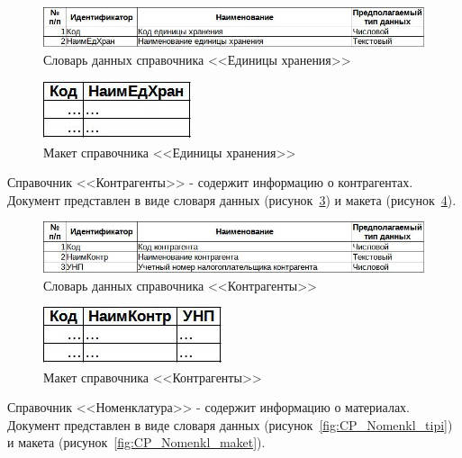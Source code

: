\documentclass[12pt, a4paper, simple]{eskdtext}
\begin{document}
    \begin{figure}[!h]
        \centering
        \includegraphics[width=14cm]
            {_docs/СП_ЕдХран_типы.jpg}
        \caption{Словарь данных справочника <<Единицы хранения>>}
        \label{fig:CP_EdXran_tipi}
    \end{figure}

    \begin{figure}[!h]
        \centering
        \includegraphics[]
            {_docs/СП_ЕдХран_макет.jpg}
        \caption{Макет справочника <<Единицы хранения>>}
        \label{fig:CP_EdXran_maket}
    \end{figure}

    Справочник <<Контрагенты>> - содержит информацию о контрагентах.
    Документ представлен в виде словаря данных (рисунок~\ref{fig:CP_Kontrag_tipi})
    и макета (рисунок~\ref{fig:CP_Kontrag_maket}).

    \begin{figure}[!h]
        \centering
        \includegraphics[width=14cm]
            {_docs/СП_Контраг_типы.jpg}
        \caption{Словарь данных справочника <<Контрагенты>>}
        \label{fig:CP_Kontrag_tipi}
    \end{figure}

    \begin{figure}[!h]
        \centering
        \includegraphics[]
            {_docs/СП_Контраг_макет.jpg}
        \caption{Макет справочника <<Контрагенты>>}
        \label{fig:CP_Kontrag_maket}
    \end{figure}

    Справочник <<Номенклатура>> - содержит информацию о материалах.
    Документ представлен в виде словаря данных (рисунок~\ref{fig:CP_Nomenkl_tipi})
    и макета (рисунок~\ref{fig:CP_Nomenkl_maket}).
\end{document}

